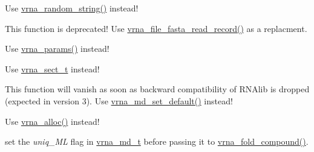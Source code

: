 \begin{DoxyRefList}
\item[\label{deprecated__deprecated000126}%
\hypertarget{deprecated__deprecated000126}{}%
Global \hyperlink{string__utils_8h_a1b95eac365a021572e1c37e5993a89be}{random\+\_\+string} (int l, const char symbols\mbox{[}\mbox{]})]Use \hyperlink{group__string__utils_ga4eeb3750dcf860b9f3158249f95dbd7f}{vrna\+\_\+random\+\_\+string()} instead!  
\item[\label{deprecated__deprecated000061}%
\hypertarget{deprecated__deprecated000061}{}%
Global \hyperlink{group__file__utils_gafd194a69af9d92b5b0412a7627ac1595}{read\+\_\+record} (char $\ast$$\ast$header, char $\ast$$\ast$sequence, char $\ast$$\ast$$\ast$rest, unsigned int options)]This function is deprecated! Use \hyperlink{group__file__utils_ga8cfb7e271efc9e1f34640acb85475639}{vrna\+\_\+file\+\_\+fasta\+\_\+read\+\_\+record()} as a replacment. 
\item[\label{deprecated__deprecated000090}%
\hypertarget{deprecated__deprecated000090}{}%
Global \hyperlink{group__energy__parameters_ga541f2cf7436e9bc939b0a49b24baf987}{scale\+\_\+parameters} (void)]Use \hyperlink{group__energy__parameters_gad0e3e7e74bdc50d1709d40c92993185e}{vrna\+\_\+params()} instead! 
\item[\label{deprecated__deprecated000045}%
\hypertarget{deprecated__deprecated000045}{}%
Global \hyperlink{group__data__structures_gaaacedee1f05d3d45aa6764eca51a8876}{sect} ]Use \hyperlink{group__data__structures_gacc9cdae790dac75a7024e7069c0d4400}{vrna\+\_\+sect\+\_\+t} instead!  
\item[\label{deprecated__deprecated000082}%
\hypertarget{deprecated__deprecated000082}{}%
Global \hyperlink{group__model__details_gabad896c3650d420f3f3ddefc69e2bceb}{set\+\_\+model\+\_\+details} (vrna\+\_\+md\+\_\+t $\ast$md)]This function will vanish as soon as backward compatibility of R\+N\+Alib is dropped (expected in version 3). Use \hyperlink{group__model__details_ga8ac6ff84936282436f822644bf841f66}{vrna\+\_\+md\+\_\+set\+\_\+default()} instead! 
\item[\label{deprecated__deprecated000150}%
\hypertarget{deprecated__deprecated000150}{}%
Global \hyperlink{utils_8h_ad7e1e137b3bf1f7108933d302a7f0177}{space} (unsigned size)]Use \hyperlink{group__utils_gaf37a0979367c977edfb9da6614eebe99}{vrna\+\_\+alloc()} instead!  
\item[\label{deprecated__deprecated000093}%
\hypertarget{deprecated__deprecated000093}{}%
Global \hyperlink{group__subopt__stochbt_gacd79b1a570e6ad9be24cb11fe8cae30a}{st\+\_\+back} ]set the {\itshape uniq\+\_\+\+M\+L} flag in \hyperlink{group__model__details_ga1f8a10e12a0a1915f2a4eff0b28ea17c}{vrna\+\_\+md\+\_\+t} before passing it to \hyperlink{group__fold__compound_ga6601d994ba32b11511b36f68b08403be}{vrna\+\_\+fold\+\_\+compound()}. 

\end{DoxyRefList}
